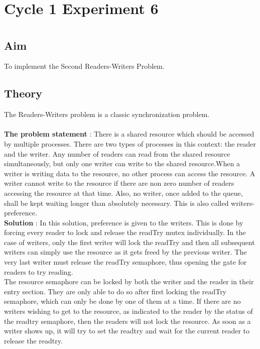 \section*{Cycle 1 Experiment 6}

\section{\Large{}}

\subsection{Aim}
\large To implement the Second Readers-Writers Problem.

\subsection{Theory}
The Readers-Writers problem is a classic synchronization problem.
\\
\\
\textbf{The problem statement }: There is a shared resource which should be accessed by multiple processes. There are two types of processes in this context: the reader and the writer. Any number of readers can read from the shared resource simultaneously, but only one writer can write to the shared resource.When a writer is writing data to the resource, no other process can access the resource. A writer cannot write to the resource if there are non zero number of readers accessing the resource at that time. Also, no writer, once added to the queue, shall be kept waiting longer than absolutely necessary. This is also called writers-preference. 
\\
\textbf{Solution }: In this solution, preference is given to the writers. This is done by forcing every reader to lock and release the readTry mutex individually. In the case of writers, only the first writer will lock the readTry and then all subsequent writers can simply use the resource as it gets freed by the previous writer. The very last writer must release the readTry semaphore, thus opening the gate for readers to try reading.\\

The resource semaphore can be locked by both the writer and the reader in their entry section. They are only able to do so after first locking the readTry semaphore, which can only be done by one of them at a time. If there are no writers wishing to get to the resource, as indicated to the reader by the status of the readtry semaphore, then the readers will not lock the resource. As soon as a writer shows up, it will try to set the readtry and wait for the current
reader to release the readtry.
\\

